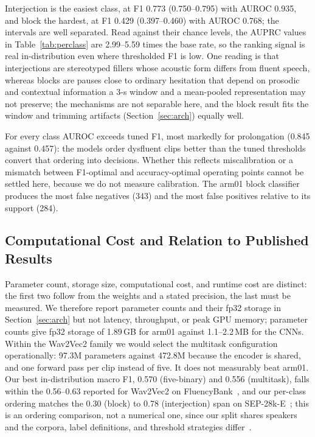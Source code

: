 \documentclass[a4paper,orivec]{llncs}
\begin{document}
Interjection is the easiest class, at F1 0.773 (0.750--0.795) with AUROC 0.935,
and block the hardest, at F1 0.429 (0.397--0.460) with AUROC 0.768; the intervals
are well separated. Read against their chance levels, the AUPRC values in
Table~\ref{tab:perclass} are 2.99--5.59 times the base rate, so the ranking signal
is real in-distribution even where thresholded F1 is low. One reading is that
interjections are stereotyped fillers whose acoustic form differs from fluent
speech, whereas blocks are pauses close to ordinary hesitation that depend on
prosodic and contextual information a 3-s window and a mean-pooled representation
may not preserve; the mechanisms are not separable here, and the block result
fits the window and trimming artifacts (Section~\ref{sec:arch}) equally well.

For every class AUROC exceeds tuned F1, most markedly for prolongation (0.845
against 0.457): the models order dysfluent clips better than the tuned thresholds
convert that ordering into decisions. Whether this reflects miscalibration or a
mismatch between F1-optimal and accuracy-optimal operating points cannot be
settled here, because we do not measure calibration. The arm01 block classifier
produces the most false negatives (343) and the most false positives relative to
its support (284).

\subsection{Computational Cost and Relation to Published Results}
\label{sec:compute}
Parameter count, storage size, computational cost, and runtime cost are distinct:
the first two follow from the weights and a stated precision, the last must be
measured. We therefore report parameter counts and their fp32 storage in
Section~\ref{sec:arch} but not latency, throughput, or peak GPU memory; parameter
counts give fp32 storage of 1.89\,GB for arm01 against 1.1--2.2\,MB for the CNNs.
Within the Wav2Vec2 family we would select the multitask configuration
operationally: 97.3M parameters against 472.8M because the encoder is shared, and
one forward pass per clip instead of five. It does not measurably beat arm01. Our
best in-distribution macro F1, 0.570 (five-binary) and 0.556 (multitask), falls
within the 0.56--0.63 reported for Wav2Vec2 on FluencyBank~\cite{bayerl2022multi},
and our per-class ordering matches the 0.30 (block) to 0.78 (interjection) span on
SEP-28k-E~\cite{susac2026stuttmil}; this is an ordering comparison, not a numerical
one, since our split shares speakers and the corpora, label definitions, and
threshold strategies differ~\cite{bayerl2022partitioning}.
\end{document}
